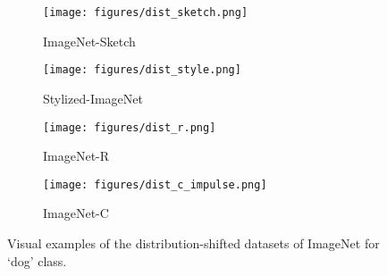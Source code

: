 \begin{figure}[h]
\centering\small
\begin{subfigure}{0.24\textwidth}
\texttt{[image: figures/dist\_sketch.png]}
\caption{ImageNet-Sketch \citep{wang2019learning}}
\end{subfigure}
\begin{subfigure}{0.24\textwidth}
\texttt{[image: figures/dist\_style.png]}
\caption{Stylized-ImageNet \citep{geirhos2019imagenet}}
\end{subfigure}
\begin{subfigure}{0.24\textwidth}
\texttt{[image: figures/dist\_r.png]}
\caption{ImageNet-R \citep{hendrycks2020many}}
\end{subfigure}
\begin{subfigure}{0.24\textwidth}
\texttt{[image: figures/dist\_c\_impulse.png]}
\caption{ImageNet-C \citep{hendrycks2019robustness}}
\end{subfigure}
\caption{
Visual examples of the distribution-shifted datasets of ImageNet \citep{deng2009imagenet} for `dog' class.
}\label{fig:dist-shifts}
\end{figure}
